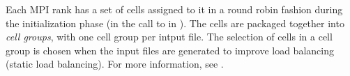 Each MPI rank has a set of cells assigned to it in a round robin fashion during the initialization phase (in the call to  in ).
The cells are packaged together into \emph{cell groups}, with one cell group per intput file. The selection of cells in a cell group is chosen when the input files are generated to improve load balancing (static load balancing).
For more information, see .


%
%

